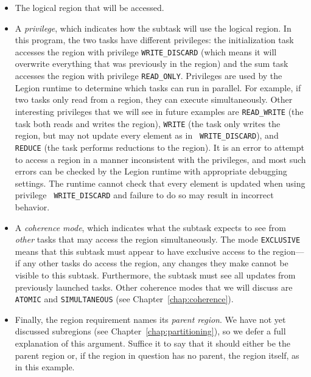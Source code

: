 \begin{itemize}

\item The logical region that will be accessed.

\item A {\em privilege}, which indicates how the subtask will
  use the logical region.  In this program, the two tasks have
  different privileges: the initialization task accesses the region
  with privilege {\tt WRITE\_DISCARD} (which means it will overwrite
  everything that was previously in the region) and the sum task
  accesses the region with privilege {\tt READ\_ONLY}.  Privileges are
  used by the Legion runtime to determine which tasks can run in
  parallel.  For example, if two tasks only read from a region, they
  can execute simultaneously.  Other interesting privileges that we
  will see in future examples are {\tt READ\_WRITE} (the task both
  reads and writes the region), {\tt WRITE} (the task only writes the
  region, but may not update every element as in {\tt
    WRITE\_DISCARD}), and {\tt REDUCE} (the task performs reductions
  to the region).  It is an error to attempt to access a region in a
  manner inconsistent with the privileges, and most such errors can be
  checked by the Legion runtime with appropriate debugging settings.
  The runtime cannot check
  that every element is updated when using privilege {\tt
    WRITE\_DISCARD} and failure to do so may result in incorrect
  behavior.

\item A {\em coherence mode}, which indicates what the subtask expects to see from {\em other} tasks that may access the
region simultaneously.  The mode {\tt EXCLUSIVE} means that this subtask must appear to have exclusive access to the region---if
any other tasks do access the region, any changes they make cannot be visible to this subtask. Furthermore, the subtask
must see all updates from previously launched tasks. Other coherence modes that we will discuss are {\tt ATOMIC} and
{\tt SIMULTANEOUS} (see Chapter~\ref{chap:coherence}).

\item Finally, the region requirement names its {\em parent region}.
  We have not yet discussed subregions (see
  Chapter~\ref{chap:partitioning}), so we defer a full explanation of
  this argument.  Suffice it to say that it should either be the
  parent region or, if the region in question has no parent, the
  region itself, as in this example.

\end{itemize}

